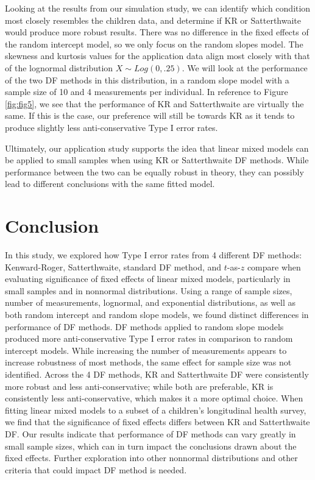 \documentclass[12pt, twoside]{amherstthesis}
\begin{document}
Looking at the results from our simulation study, we can identify which condition most closely resembles the children data, and determine if KR or Satterthwaite would produce more robust results. There was no difference in the fixed effects of the random intercept model, so we only focus on the random slopes model. The skewness and kurtosis values for the application data align most closely with that of the lognormal distribution \(X\sim\mathit{Log}(0,.25).\) We will look at the performance of the two DF methods in this distribution, in a random slope model with a sample size of 10 and 4 measurements per individual. In reference to Figure \ref{fig:fig5}, we see that the performance of KR and Satterthwaite are virtually the same. If this is the case, our preference will still be towards KR as it tends to produce slightly less anti-conservative Type I error rates.

Ultimately, our application study supports the idea that linear mixed models can be applied to small samples when using KR or Satterthwaite DF methods. While performance between the two can be equally robust in theory, they can possibly lead to different conclusions with the same fitted model.

\hypertarget{conclusion-1}{%
\chapter*{Conclusion}\label{conclusion-1}}

In this study, we explored how Type I error rates from 4 different DF methods: Kenward-Roger, Satterthwaite, standard DF method, and \(t\)-as-\(z\) compare when evaluating significance of fixed effects of linear mixed models, particularly in small samples and in nonnormal distributions. Using a range of sample sizes, number of measurements, lognormal, and exponential distributions, as well as both random intercept and random slope models, we found distinct differences in performance of DF methods. DF methods applied to random slope models produced more anti-conservative Type I error rates in comparison to random intercept models. While increasing the number of measurements appears to increase robustness of most methods, the same effect for sample size was not identified. Across the 4 DF methods, KR and Satterthwaite DF were consistently more robust and less anti-conservative; while both are preferable, KR is consistently less anti-conservative, which makes it a more optimal choice. When fitting linear mixed models to a subset of a children's longitudinal health survey, we find that the significance of fixed effects differs between KR and Satterthwaite DF. Our results indicate that performance of DF methods can vary greatly in small sample sizes, which can in turn impact the conclusions drawn about the fixed effects. Further exploration into other nonnormal distributions and other criteria that could impact DF method is needed.
\end{document}
